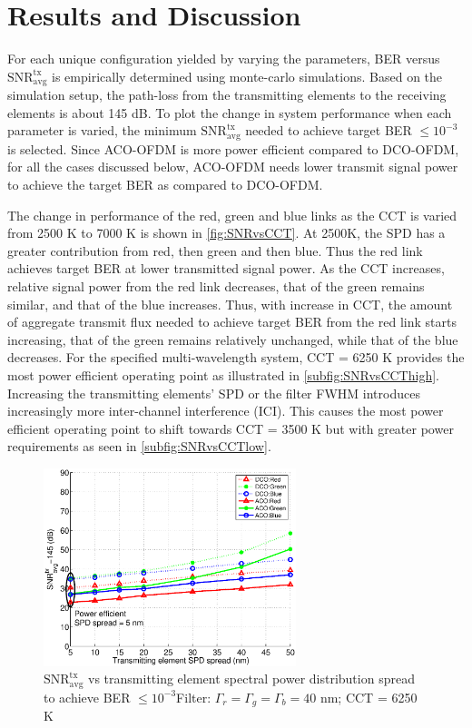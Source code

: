\section{Results and Discussion}\label{sec:results}
For each unique configuration yielded by varying the parameters, BER versus $\text{SNR}^{\text{tx}}_{\text{avg}}$ is empirically determined using monte-carlo simulations. Based on the simulation setup, the path-loss from the transmitting elements to the receiving elements is about 145 dB. To plot the change in system performance when each parameter is varied, the minimum $\text{SNR}^{\text{tx}}_{\text{avg}}$ needed to achieve target BER $\leq 10^{-3}$ is selected. Since ACO-OFDM is more power efficient compared to DCO-OFDM, for all the cases discussed below, ACO-OFDM needs lower transmit signal power to achieve the target BER as compared to DCO-OFDM.

The change in performance of the red, green and blue links as the CCT is varied from 2500 K to 7000 K is shown in \figurename{\ref{fig:SNRvsCCT}}. At 2500K, the SPD has a greater contribution from red, then green and then blue. Thus the red link achieves target BER at lower transmitted signal power. As the CCT increases, relative signal power from the red link decreases, that of the green remains similar, and that of the blue increases. Thus, with increase in CCT, the amount of aggregate transmit flux needed to achieve target BER from the red link starts increasing, that of the green remains relatively unchanged, while that of the blue decreases. For the specified multi-wavelength system, CCT = 6250 K provides the most power efficient operating point as illustrated in \figurename{\ref{subfig:SNRvsCCThigh}}. Increasing the transmitting elements' SPD or the filter FWHM introduces increasingly more inter-channel interference (ICI). This causes the most power efficient operating point to shift towards CCT = 3500 K but with greater power requirements as seen in \figurename{\ref{subfig:SNRvsCCTlow}}.

\begin{figure}[!b]
	\centering
		\includegraphics[trim={0.15in 0.05in 0.05in 0.35in}, clip=true, width=2.9in]{img/SNRvsLEDSD.eps}
	\caption{$\text{SNR}^{\text{tx}}_{\text{avg}}$ vs transmitting element spectral power distribution spread to achieve BER $\leq 10^{-3}$\newline Filter: $\Gamma_r = \Gamma_g = \Gamma_b = 40$ nm; CCT = 6250 K}
	\label{fig:SNRvsLEDSD}
\end{figure}

